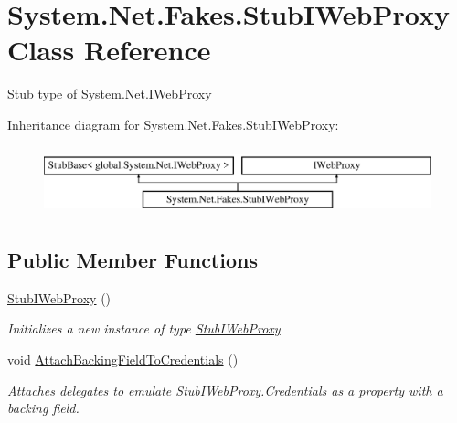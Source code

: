 \hypertarget{class_system_1_1_net_1_1_fakes_1_1_stub_i_web_proxy}{\section{System.\-Net.\-Fakes.\-Stub\-I\-Web\-Proxy Class Reference}
\label{class_system_1_1_net_1_1_fakes_1_1_stub_i_web_proxy}
}


Stub type of System.\-Net.\-I\-Web\-Proxy 


Inheritance diagram for System.\-Net.\-Fakes.\-Stub\-I\-Web\-Proxy\-:\begin{figure}[H]
\begin{center}
\leavevmode
\includegraphics[height=2.000000cm]{class_system_1_1_net_1_1_fakes_1_1_stub_i_web_proxy}
\end{center}
\end{figure}
\subsection*{Public Member Functions}
\begin{DoxyCompactItemize}
\item 
\hyperlink{class_system_1_1_net_1_1_fakes_1_1_stub_i_web_proxy_a10c7a1a853788e34c702fececd53cc3e}{Stub\-I\-Web\-Proxy} ()
\begin{DoxyCompactList}\small\item\em Initializes a new instance of type \hyperlink{class_system_1_1_net_1_1_fakes_1_1_stub_i_web_proxy}{Stub\-I\-Web\-Proxy}\end{DoxyCompactList}\item 
void \hyperlink{class_system_1_1_net_1_1_fakes_1_1_stub_i_web_proxy_a582bc2f9255f0aa83abb0671a026fc83}{Attach\-Backing\-Field\-To\-Credentials} ()
\begin{DoxyCompactList}\small\item\em Attaches delegates to emulate Stub\-I\-Web\-Proxy.\-Credentials as a property with a backing field.\end{DoxyCompactList}\end{DoxyCompactItemize}
